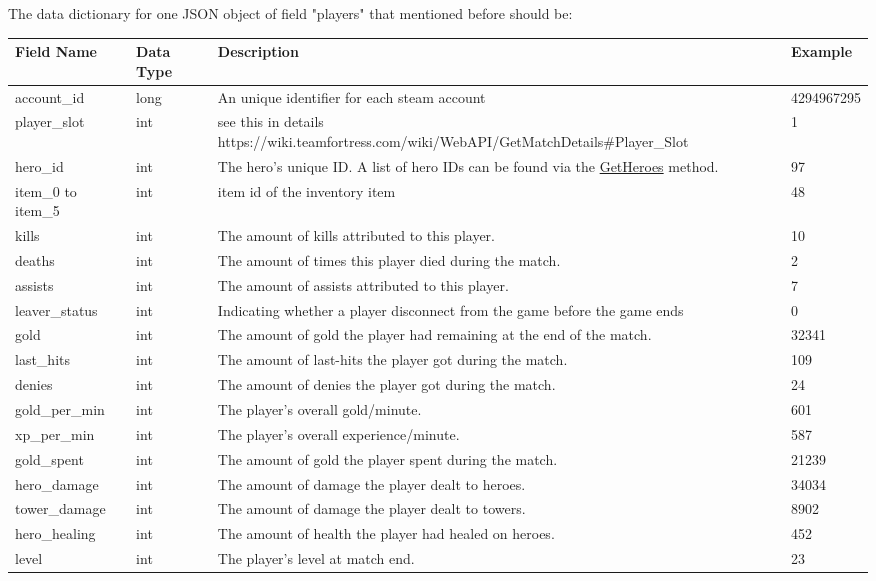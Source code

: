 \documentclass{article}
\begin{document}
The data dictionary for one JSON object of field "players" that mentioned before should be: \\
\begin{tabular}{|p{3cm}|p{2cm}|p{5cm}|p{3cm}|}
\hline
Field Name& Data Type& Description & Example\\
\hline
account\_id & long & An unique identifier for each steam account & 4294967295 \\
\hline
player\_slot & int & see this in details https://wiki.teamfortress.com/wiki/WebAPI/GetMatchDetails\#Player\_Slot & 1 \\
\hline
hero\_id & int & The hero's unique ID. A list of hero IDs can be found via the \href{https://wiki.teamfortress.com/wiki/WebAPI/GetHeroes}{GetHeroes} method. & 97 \\
\hline
item\_0 to item\_5 & int & item id of the inventory item & 48 \\
\hline
kills & int & The amount of kills attributed to this player. & 10 \\
\hline
deaths & int & The amount of times this player died during the match. & 2 \\
\hline
assists & int & The amount of assists attributed to this player. & 7 \\
\hline
leaver\_status & int & Indicating whether a player disconnect from the game before the game ends & 0 \\
\hline
gold & int & The amount of gold the player had remaining at the end of the match. & 32341 \\
\hline
last\_hits & int & The amount of last-hits the player got during the match. & 109 \\
\hline
denies & int & The amount of denies the player got during the match. & 24 \\
\hline
gold\_per\_min & int &  The player's overall gold/minute. & 601 \\
\hline
xp\_per\_min & int & The player's overall experience/minute. & 587 \\
\hline
gold\_spent & int & The amount of gold the player spent during the match. & 21239 \\
\hline
hero\_damage & int & The amount of damage the player dealt to heroes. & 34034 \\
\hline
tower\_damage & int & The amount of damage the player dealt to towers. & 8902 \\
\hline
hero\_healing & int & The amount of health the player had healed on heroes. & 452 \\
\hline
level & int & The player's level at match end. & 23 \\
\hline
\end{tabular}
\end{document}
